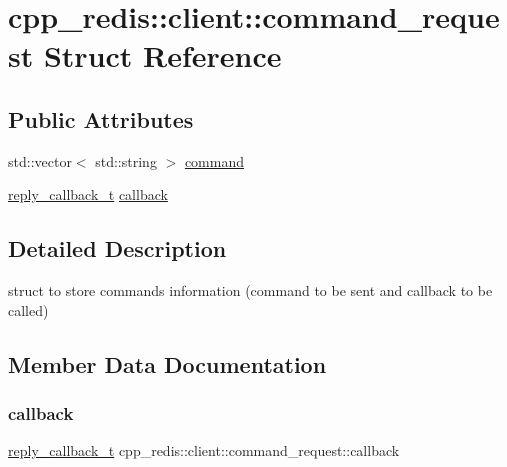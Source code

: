 \hypertarget{structcpp__redis_1_1client_1_1command__request}{}\section{cpp\+\_\+redis\+:\+:client\+:\+:command\+\_\+request Struct Reference}
\label{structcpp__redis_1_1client_1_1command__request}
\subsection*{Public Attributes}
\begin{DoxyCompactItemize}
\item 
std\+::vector$<$ std\+::string $>$ \hyperlink{structcpp__redis_1_1client_1_1command__request_ab39da4631d0385a62d02cf8e123dcb14}{command}
\item 
\hyperlink{classcpp__redis_1_1client_a061a1140d36d2eaeda82b09a0bb3f9f2}{reply\+\_\+callback\+\_\+t} \hyperlink{structcpp__redis_1_1client_1_1command__request_ac124129fd002703955032bdd8905c387}{callback}
\end{DoxyCompactItemize}


\subsection{Detailed Description}
struct to store commands information (command to be sent and callback to be called) 

\subsection{Member Data Documentation}
\mbox{\label{structcpp__redis_1_1client_1_1command__request_ac124129fd002703955032bdd8905c387}} 
\subsubsection{\texorpdfstring{callback}{callback}}
{\footnotesize\ttfamily \hyperlink{classcpp__redis_1_1client_a061a1140d36d2eaeda82b09a0bb3f9f2}{reply\+\_\+callback\+\_\+t} cpp\+\_\+redis\+::client\+::command\+\_\+request\+::callback}

